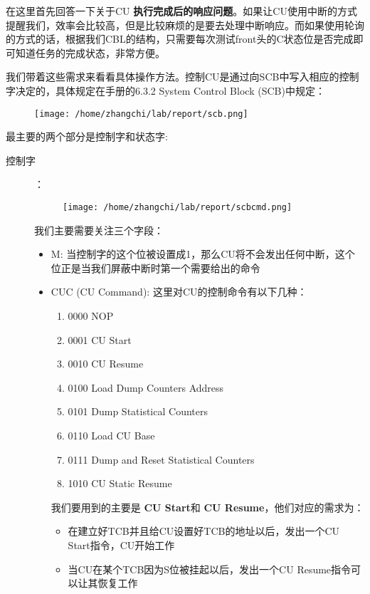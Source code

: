 \documentclass{article}
\newcommand{\highlight}[1]{{\bfseries \color{red}  #1}}
\begin{document}
\begin{CJK*}{UTF8}{gkai}
在这里首先回答一下关于CU\highlight{执行完成后的响应问题}。如果让CU使用中断的方式提醒我们，效率会比较高，但是比较麻烦的是要去处理中断响应。而如果使用轮询的方式的话，根据我们CBL的结构，只需要每次测试front头的C状态位是否完成即可知道任务的完成状态，非常方便。

我们带着这些需求来看看具体操作方法。控制CU是通过向SCB中写入相应的控制字决定的，具体规定在手册的6.3.2 System Control Block (SCB)中规定：

\begin{figure}[htp]
\centering
\texttt{[image: /home/zhangchi/lab/report/scb.png]}
\end{figure}

最主要的两个部分是控制字和状态字:

\begin{description}
\item[控制字]：\\
\begin{figure}[htp]
\centering
\texttt{[image: /home/zhangchi/lab/report/scbcmd.png]}
\end{figure}

我们主要需要关注三个字段：

\begin{itemize}
\item{M: 当控制字的这个位被设置成1，那么CU将不会发出任何中断，这个位正是当我们屏蔽中断时第一个需要给出的命令}
\item{CUC (CU Command): 这里对CU的控制命令有以下几种：

\begin{enumerate}
\item{0000 NOP}
\item{0001 CU Start}
\item{0010 CU Resume}
\item{0100 Load Dump Counters Address}
\item{0101 Dump Statistical Counters}
\item{0110 Load CU Base}
\item{0111 Dump and Reset Statistical Counters}
\item{1010 CU Static Resume} 
\end{enumerate}

我们要用到的主要是\highlight{CU Start}和\highlight{CU Resume}，他们对应的需求为：

\begin{itemize}
\item{在建立好TCB并且给CU设置好TCB的地址以后，发出一个CU Start指令，CU开始工作}
\item{当CU在某个TCB因为S位被挂起以后，发出一个CU Resume指令可以让其恢复工作}
\end{itemize}

}
\end{itemize}
\end{description}
\end{CJK*}
\end{document}

